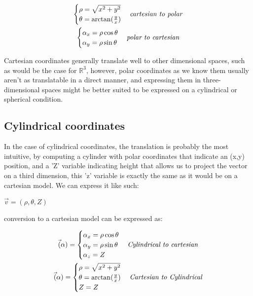\documentclass[11pt,fleqn]{book} %
\begin{document}
\begin{gather}
    \begin{cases}
        \rho = \sqrt{x^2+y^2} \\
        \theta = \arctan(\frac{y}{x})
    \end{cases}
    \text{\textit{cartesian to polar}}\\
    \begin{cases}
        \alpha_x = \rho \cos \theta \\
        \alpha_y = \rho \sin \theta
    \end{cases}
    \text{\textit{polar to cartesian}}
\end{gather}

Cartesian coordinates generally translate well to other dimensional spaces, such as would be the case
for $ \mathbb{R}^3 $, however, polar coordinates as we know them usually aren't as translatable in a direct
manner, and expressing them in three-dimensional spaces might be better suited to 
be expressed on a cylindrical or spherical condition. 
\subsection{Cylindrical coordinates}
In the case of cylindrical coordinates, the translation is probably the most intuitive, by computing
a cylinder with polar coordinates that indicate an (x,y) position, and a 'Z' variable indicating height 
that allows us to project the vector on a third dimension, this 'z' variable is exactly the same as it would be
on a cartesian model. We can express it like such:

$ \vec{v} = ( \rho, \theta, Z) $

conversion to a cartesian model can be expressed as:

\begin{gather}
    \vec(\alpha) =
    \begin{cases}
        \alpha_x = \rho \cos \theta \\
        \alpha_y = \rho \sin \theta \\
        \alpha_z = Z
    \end{cases}
    \text{\textit{Cylindrical to cartesian}}
    \\
    \vec(\alpha) =
    \begin{cases}
        \rho = \sqrt{x^2 + y^2} \\
        \theta =  \arctan(\frac{y}{x}) \\
        Z = Z
    \end{cases}
    \text{\textit{Cartesian to Cylindrical}}
\end{gather}
\end{document}
